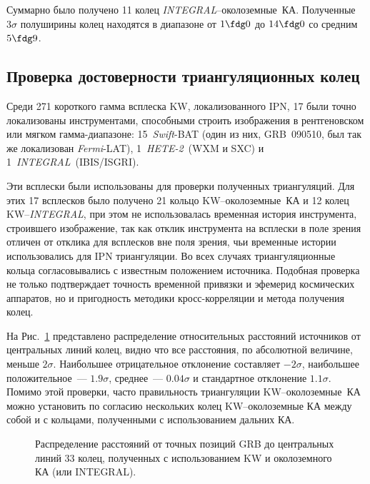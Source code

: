 Суммарно было получено 11 колец \textit{INTEGRAL}--околоземные~КА. Полученные $3\sigma$ 
полуширины колец находятся в диапазоне от $1\fdg0$ до $14\fdg0$ 
со средним $5\fdg9$.

\subsection{Проверка достоверности триангуляционных колец}
Среди 271 короткого гамма всплеска KW, локализованного IPN, 17 были точно 
локализованы инструментами, способными строить изображения в рентгеновском или 
мягком гамма-диапазоне: 15~\textit{Swift}-BAT (один из них, GRB~090510, был 
так же локализован \textit{Fermi}-LAT), 1~\textit{HETE-2}~(WXM и SXC) и 1~\textit{INTEGRAL}~(IBIS/ISGRI).

Эти всплески были использованы для проверки полученных триангуляций. Для этих 17 всплесков 
было получено 21 кольцо KW--околоземные~КА и 12 колец KW--\textit{INTEGRAL}, 
при этом не использовалась временная история инструмента, строившего изображение, 
так как отклик инструмента на всплески в поле зрения отличен от отклика для всплесков 
вне поля зрения, чьи временные истории использовались для IPN триангуляции. 
Во всех случаях триангуляционные кольца согласовывались с известным положением источника. 
Подобная проверка не только подтверждает точность временной привязки и эфемерид космических
аппаратов, но и пригодность методики кросс-корреляции и метода получения колец.

На Рис.~\ref{img:dN_33_rel_offset} представлено распределение относительных расстояний источников 
от центральных линий колец, видно что все расстояния, по абсолютной величине, меньше $2\sigma$.
Наибольшее отрицательное отклонение составляет $-2\sigma$, 
наибольшее положительное~--- $1.9\sigma$, среднее~--- $0.04\sigma$ и стандартное отклонение $1.1\sigma$.
Помимо этой проверки, часто правильность триангуляции KW--околоземные~КА можно 
установить по согласию нескольких колец KW--околоземные КА между собой 
и с кольцами, полученными с использованием дальних КА.

\begin{figure}[h]
    \caption[Распределение расстояний от центра кольца до точного положения источника]
    {Распределение расстояний от точных позиций GRB до центральных линий 33 колец, 
    полученных с использованием  KW и околоземного КА (или INTEGRAL).
    }
 \label{img:dN_33_rel_offset}  
\end{figure}

